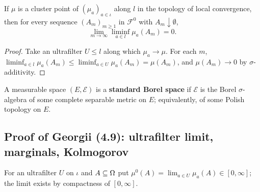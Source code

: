 \begin{theorem}
    \label{thm:cp-necessary}
    \leanok

    If $\mu$ is a cluster point of $(\mu_a)_{a \in \iota}$ along $l$ in the topology of local
    convergence, then for every sequence $(A_m)_{m \geq 1}$ in $\mathcal{F}^0$ with
    $A_m \downarrow \emptyset$,
    \[\lim_{m \to \infty} \liminf_{a \in l} \mu_a(A_m) = 0.\]
\end{theorem}
\begin{proof}
    \leanok

    Take an ultrafilter $U \leq l$ along which $\mu_a \to \mu$. For each $m$,
    $\liminf_{a \in l} \mu_a(A_m) \leq \liminf_{a \in U} \mu_a(A_m) = \mu(A_m)$, and
    $\mu(A_m) \to 0$ by $\sigma$-additivity.
\end{proof}

\begin{definition}
    \label{def:cp-standard-borel}
    \leanok

    A measurable space $(E, \mathcal{E})$ is a \textbf{standard Borel space} if $\mathcal{E}$
    is the Borel $\sigma$-algebra of some complete separable metric on $E$; equivalently, of
    some Polish topology on $E$.
\end{definition}

\subsection*{Proof of Georgii (4.9): ultrafilter limit, marginals, Kolmogorov}

\begin{definition}
    \label{def:cp-ultrafilter-limit}
    \leanok

    For an ultrafilter $U$ on $\iota$ and $A \subseteq \Omega$ put
    $\mu^0(A) = \lim_{a \in U} \mu_a(A) \in [0,\infty]$; the limit exists by compactness of
    $[0,\infty]$.
\end{definition}

